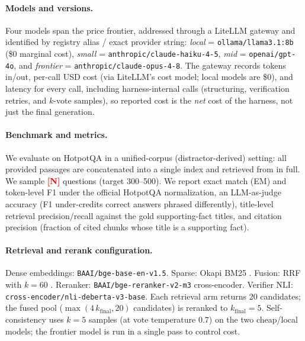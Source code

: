 \documentclass[twocolumn,10pt]{article}
\newcommand{\NUM}[1]{\textcolor{red}{\textbf{[#1]}}}
\begin{document}

\paragraph{Models and versions.}
Four models span the price frontier, addressed through a LiteLLM gateway and
identified by registry alias / exact provider string:
\emph{local} = \texttt{ollama/llama3.1:8b} (\$0 marginal cost),
\emph{small} = \texttt{anthropic/claude-haiku-4-5},
\emph{mid} = \texttt{openai/gpt-4o}, and
\emph{frontier} = \texttt{anthropic/claude-opus-4-8}. The gateway records
tokens in/out, per-call USD cost (via LiteLLM's cost model; local models are
\$0), and latency for every call, including harness-internal calls
(structuring, verification retries, and $k$-vote samples), so reported cost is
the \emph{net} cost of the harness, not just the final generation.

\paragraph{Benchmark and metrics.}
We evaluate on HotpotQA \citep{yang2018hotpotqa} in a unified-corpus
(distractor-derived) setting: all provided passages are concatenated into a
single index and retrieved from in full. We sample \NUM{N} questions
(target 300--500). We report exact match (EM) and token-level F1 under the
official HotpotQA normalization, an LLM-as-judge accuracy (F1 under-credits
correct answers phrased differently), title-level retrieval precision/recall
against the gold supporting-fact titles, and citation precision (fraction of
cited chunks whose title is a supporting fact).

\paragraph{Retrieval and rerank configuration.}
Dense embeddings: \texttt{BAAI/bge-base-en-v1.5}. Sparse: Okapi BM25
\citep{robertson2009bm25}. Fusion: RRF with $k=60$
\citep{cormack2009rrf}. Reranker: \texttt{BAAI/bge-reranker-v2-m3}
cross-encoder. Verifier NLI: \texttt{cross-encoder/nli-deberta-v3-base}. Each
retrieval arm returns 20 candidates; the fused pool ($\max(4\,k_{\text{final}},20)$
candidates) is reranked to $k_{\text{final}}=5$. Self-consistency uses $k=5$
samples (at vote temperature $0.7$) on the two cheap/local models; the
frontier model is run in a single pass to control cost.
\end{document}

